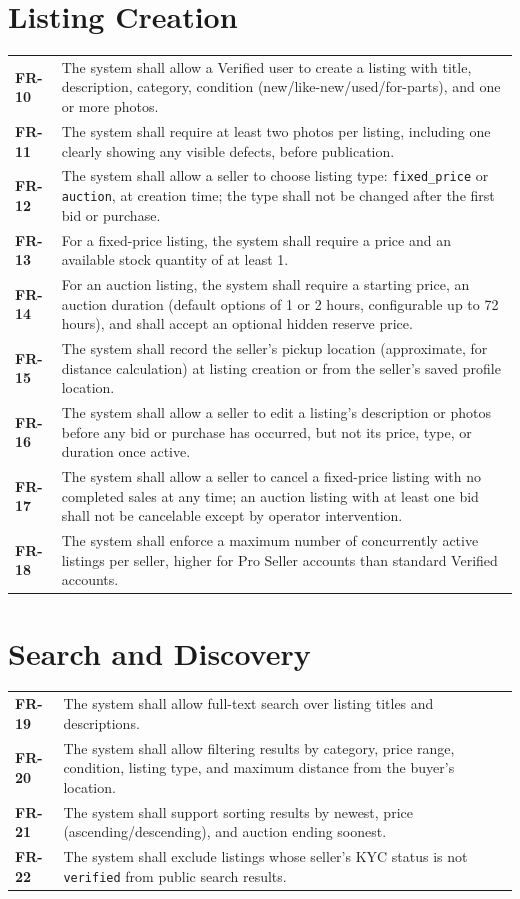 \documentclass[11pt,a4paper]{report}
\newenvironment{reqtable}{\begin{longtable}{p{2.2cm}p{11.5cm}}}{\end{longtable}}
\begin{document}
\section{Listing Creation}
\begin{reqtable}
\textbf{FR-10} & The system shall allow a Verified user to create a listing with title, description, category, condition (new/like-new/used/for-parts), and one or more photos. \\
\textbf{FR-11} & The system shall require at least two photos per listing, including one clearly showing any visible defects, before publication. \\
\textbf{FR-12} & The system shall allow a seller to choose listing type: \texttt{fixed\_price} or \texttt{auction}, at creation time; the type shall not be changed after the first bid or purchase. \\
\textbf{FR-13} & For a fixed-price listing, the system shall require a price and an available stock quantity of at least 1. \\
\textbf{FR-14} & For an auction listing, the system shall require a starting price, an auction duration (default options of 1 or 2 hours, configurable up to 72 hours), and shall accept an optional hidden reserve price. \\
\textbf{FR-15} & The system shall record the seller's pickup location (approximate, for distance calculation) at listing creation or from the seller's saved profile location. \\
\textbf{FR-16} & The system shall allow a seller to edit a listing's description or photos before any bid or purchase has occurred, but not its price, type, or duration once active. \\
\textbf{FR-17} & The system shall allow a seller to cancel a fixed-price listing with no completed sales at any time; an auction listing with at least one bid shall not be cancelable except by operator intervention. \\
\textbf{FR-18} & The system shall enforce a maximum number of concurrently active listings per seller, higher for Pro Seller accounts than standard Verified accounts. \\
\end{reqtable}

\section{Search and Discovery}
\begin{reqtable}
\textbf{FR-19} & The system shall allow full-text search over listing titles and descriptions. \\
\textbf{FR-20} & The system shall allow filtering results by category, price range, condition, listing type, and maximum distance from the buyer's location. \\
\textbf{FR-21} & The system shall support sorting results by newest, price (ascending/descending), and auction ending soonest. \\
\textbf{FR-22} & The system shall exclude listings whose seller's KYC status is not \texttt{verified} from public search results. \\
\end{reqtable}
\end{document}
